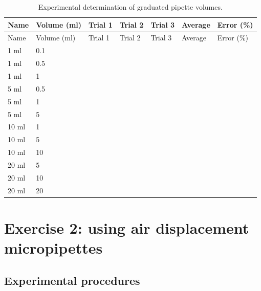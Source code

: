 \documentclass[]{book}
\begin{document}
\begin{longtable}[]{@{}lllllll@{}}
\caption{\label{tab:graduated} Experimental determination of graduated pipette volumes.}\tabularnewline
\toprule
Name & Volume (ml) & Trial 1 & Trial 2 & Trial 3 & Average & Error (\%)\tabularnewline
\midrule
\endfirsthead
\toprule
Name & Volume (ml) & Trial 1 & Trial 2 & Trial 3 & Average & Error (\%)\tabularnewline
\midrule
\endhead
1 ml & 0.1 & & & & &\tabularnewline
1 ml & 0.5 & & & & &\tabularnewline
1 ml & 1 & & & & &\tabularnewline
5 ml & 0.5 & & & & &\tabularnewline
5 ml & 1 & & & & &\tabularnewline
5 ml & 5 & & & & &\tabularnewline
10 ml & 1 & & & & &\tabularnewline
10 ml & 5 & & & & &\tabularnewline
10 ml & 10 & & & & &\tabularnewline
20 ml & 5 & & & & &\tabularnewline
20 ml & 10 & & & & &\tabularnewline
20 ml & 20 & & & & &\tabularnewline
\bottomrule
\end{longtable}

\hypertarget{exercise-2-using-air-displacement-micropipettes}{%
\section{Exercise 2: using air displacement micropipettes}\label{exercise-2-using-air-displacement-micropipettes}}

\hypertarget{experimental-procedures-6}{%
\subsection{Experimental procedures}\label{experimental-procedures-6}}
\end{document}
